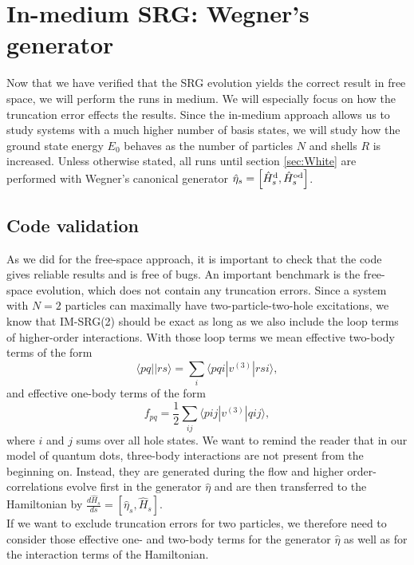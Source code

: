 \section{In-medium SRG: Wegner's generator}
\label{sec:IMSRGres}
Now that we have verified that the SRG evolution yields the correct result in free space, we will perform the runs in medium. We will especially focus on how the truncation error effects the results. Since the in-medium approach allows us to study systems with a much higher number of basis states, we will study how the ground state energy $E_0$ behaves as the number of particles $N$ and shells $R$ is increased. Unless otherwise stated, all runs until section \ref{sec:White} are performed with Wegner's canonical generator $\hat{\eta}_s = \left[ \hat{H}^{\rm d}_s, \hat{H}^{\rm od}_s \right]$.

\subsection{Code validation}
As we did for the free-space approach, it is important to check that the code gives reliable results and is free of bugs. An important benchmark is the free-space evolution, which does not contain any truncation errors. Since a system with $N=2$ particles can maximally have two-particle-two-hole excitations, we know that IM-SRG(2) should be exact as long as we also include the loop terms of higher-order interactions. With those loop terms we mean effective two-body terms of the form
\[
\langle p q || r s \rangle = \sum_i \langle p q i | v^{(3)} | r s i \rangle,
\]
and effective one-body terms of the form
\[
f_{pq} = \frac{1}{2}\sum_{ij} \langle p i j | v^{(3)} | q i j \rangle, 
\] 
where $i$ and $j$ sums over all hole states. We want to remind the reader that in our model of quantum dots, three-body interactions are not present from the beginning on. Instead, they are generated during the flow and higher order-correlations evolve first in the generator $\hat{\eta}$ and are then transferred to the Hamiltonian by $\frac{d \hat{H}_s}{ds} = \left[ \hat{\eta}_s, \hat{H}_s \right]$. \\
If we want to exclude truncation errors for two particles, we therefore need to consider those effective one- and two-body terms for the generator $\hat{\eta}$ as well as for the interaction terms of the Hamiltonian.


